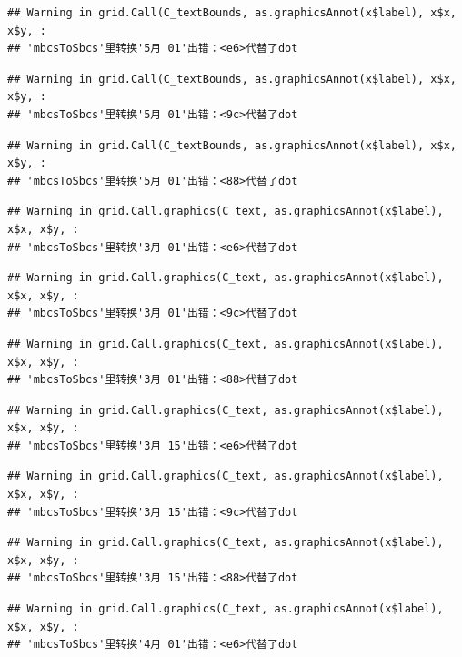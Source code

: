 \documentclass[
]{article}
\begin{document}
\begin{verbatim}
## Warning in grid.Call(C_textBounds, as.graphicsAnnot(x$label), x$x, x$y, :
## 'mbcsToSbcs'里转换'5月 01'出错：<e6>代替了dot
\end{verbatim}

\begin{verbatim}
## Warning in grid.Call(C_textBounds, as.graphicsAnnot(x$label), x$x, x$y, :
## 'mbcsToSbcs'里转换'5月 01'出错：<9c>代替了dot
\end{verbatim}

\begin{verbatim}
## Warning in grid.Call(C_textBounds, as.graphicsAnnot(x$label), x$x, x$y, :
## 'mbcsToSbcs'里转换'5月 01'出错：<88>代替了dot
\end{verbatim}

\begin{verbatim}
## Warning in grid.Call.graphics(C_text, as.graphicsAnnot(x$label), x$x, x$y, :
## 'mbcsToSbcs'里转换'3月 01'出错：<e6>代替了dot
\end{verbatim}

\begin{verbatim}
## Warning in grid.Call.graphics(C_text, as.graphicsAnnot(x$label), x$x, x$y, :
## 'mbcsToSbcs'里转换'3月 01'出错：<9c>代替了dot
\end{verbatim}

\begin{verbatim}
## Warning in grid.Call.graphics(C_text, as.graphicsAnnot(x$label), x$x, x$y, :
## 'mbcsToSbcs'里转换'3月 01'出错：<88>代替了dot
\end{verbatim}

\begin{verbatim}
## Warning in grid.Call.graphics(C_text, as.graphicsAnnot(x$label), x$x, x$y, :
## 'mbcsToSbcs'里转换'3月 15'出错：<e6>代替了dot
\end{verbatim}

\begin{verbatim}
## Warning in grid.Call.graphics(C_text, as.graphicsAnnot(x$label), x$x, x$y, :
## 'mbcsToSbcs'里转换'3月 15'出错：<9c>代替了dot
\end{verbatim}

\begin{verbatim}
## Warning in grid.Call.graphics(C_text, as.graphicsAnnot(x$label), x$x, x$y, :
## 'mbcsToSbcs'里转换'3月 15'出错：<88>代替了dot
\end{verbatim}

\begin{verbatim}
## Warning in grid.Call.graphics(C_text, as.graphicsAnnot(x$label), x$x, x$y, :
## 'mbcsToSbcs'里转换'4月 01'出错：<e6>代替了dot
\end{verbatim}
\end{document}
